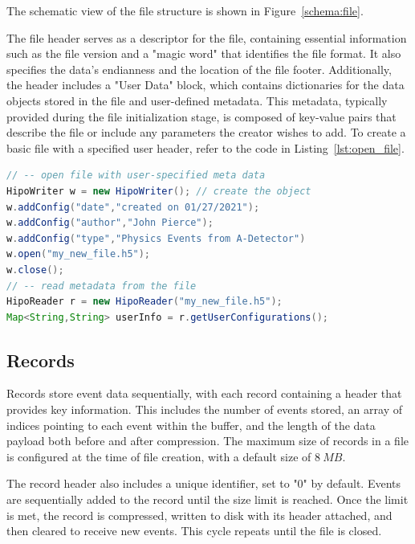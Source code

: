 \documentclass[preprint,12pt]{elsarticle}
\begin{document}
The schematic view of the file structure is shown in Figure~\ref{schema:file}. 

The file header serves as a descriptor for the file, containing essential information such as the file version and a "magic word" that identifies the file format. It also specifies the data's endianness and the location of the file footer. Additionally, the header includes a "User Data" block, which contains dictionaries for the data objects stored in the file and user-defined metadata. This metadata, typically provided during the file initialization stage, is composed of key-value pairs that describe the file or include any parameters the creator wishes to add. To create a basic file with a specified user header, refer to the code in Listing~\ref{lst:open_file}.

\begin{lstlisting}[language=java, caption=Java example for writing a file with meta-data. The reader object opens the file and retrieves the stored mata data in a form of a key/value map., label=lst:open_file]
// -- open file with user-specified meta data
HipoWriter w = new HipoWriter(); // create the object
w.addConfig("date","created on 01/27/2021");
w.addConfig("author","John Pierce");
w.addConfig("type","Physics Events from A-Detector")
w.open("my_new_file.h5");
w.close();
// -- read metadata from the file
HipoReader r = new HipoReader("my_new_file.h5");
Map<String,String> userInfo = r.getUserConfigurations();
\end{lstlisting}

\subsection{Records}

Records store event data sequentially, with each record containing a header that provides key information. This includes the number of events stored, an array of indices pointing to each event within the buffer, and the length of the data payload both before and after compression. The maximum size of records in a file is configured at the time of file creation, with a default size of $8~{MB}$. 

The record header also includes a unique identifier, set to "0" by default. Events are sequentially added to the record until the size limit is reached. Once the limit is met, the record is compressed, written to disk with its header attached, and then cleared to receive new events. This cycle repeats until the file is closed.
\end{document}
